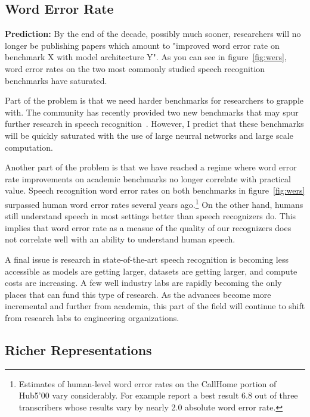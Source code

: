 \subsection{Word Error Rate}
\label{sec:wer}

{\bf Prediction:} By the end of the decade, possibly much sooner, researchers
will no longer be publishing papers which amount to "improved word error rate
on benchmark X with model architecture Y". As you can see in
figure~\ref{fig:wers}, word error rates on the two most commonly studied speech
recognition benchmarks have saturated.

Part of the problem is that we need harder benchmarks for researchers to
grapple with. The community has recently provided two new benchmarks that may
spur further research in speech recognition~\citep{chen2021gigaspeech,
galvez2021people}. However, I predict that these benchmarks will be quickly
saturated with the use of large neurral networks and large scale
computation.

Another part of the problem is that we have reached a regime where word error
rate improvements on academic benchmarks no longer correlate with practical
value. Speech recognition word error rates on both benchmarks in
figure~\ref{fig:wers} surpassed human word error rates several years
ago.\footnote{Estimates of human-level word error rates on the CallHome portion
of Hub5'00 vary considerably. For example \citet{saon2017english} report a best
result 6.8 out of three transcribers whose results vary by nearly 2.0 absolute
word error rate.} On the other hand, humans still understand speech in most
settings better than speech recognizers do. This implies that word error rate
as a measue of the quality of our recognizers does not correlate well with an
ability to understand human speech.

A final issue is research in state-of-the-art speech recognition is becoming
less accessible as models are getting larger, datasets are getting larger, and
compute costs are increasing. A few well industry labs are rapidly becoming the
only places that can fund this type of research. As the advances become more
incremental and further from academia, this part of the field will continue to
shift from research labs to engineering organizations.

\subsection{Richer Representations}

